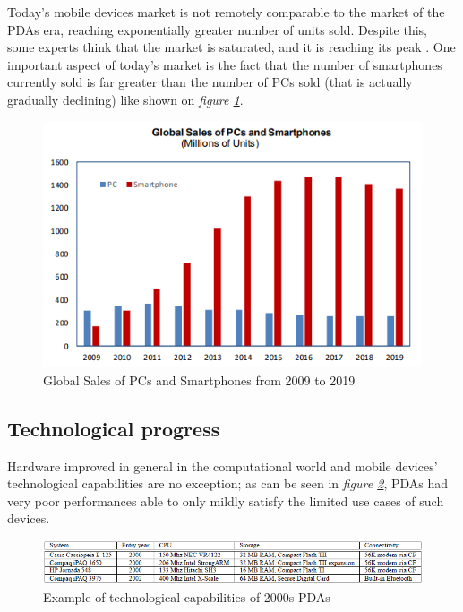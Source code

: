 Today's mobile devices market is not remotely comparable to the market of the PDAs era, reaching exponentially greater number of units sold. Despite this, some experts think that the market is saturated, and it is reaching its peak \cite{smartphones_sales}. One important aspect of today's market is the fact that the number of smartphones currently sold is far greater than the number of PCs sold (that is actually gradually declining) like shown on \textit{figure \ref{fig:global_sales_of_pcs_and_smartphones}}.

\begin{figure}[!ht]
    \centering
    \includegraphics[scale=0.9]{document/chapters/chapter_1/images/global_sales_of_pcs_and_smartphones.png}
    \caption{Global Sales of PCs and Smartphones from 2009 to 2019 \cite{smartphones_sales}}
    \label{fig:global_sales_of_pcs_and_smartphones}
\end{figure}

\subsection{Technological progress}\label{technological_progress}
Hardware improved in general in the computational world and mobile devices' technological capabilities are no exception; as can be seen in \textit{figure \ref{fig:pda_capabilities}}, PDAs had very poor performances able to only mildly satisfy the limited use cases of such devices. 

\begin{figure}[!ht]
    \centering
    \includegraphics[scale=0.77]{document/chapters/chapter_1/images/pda_capabilities.png}
    \caption{Example of technological capabilities of 2000s PDAs \cite{integrating_mobile_devices_into_grid}}
    \label{fig:pda_capabilities}
\end{figure}

